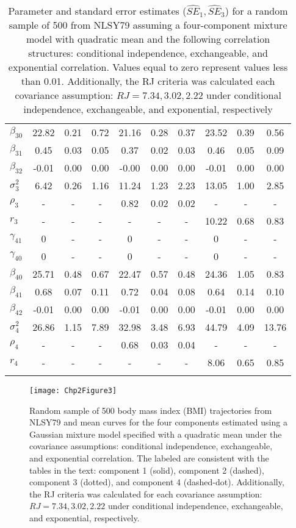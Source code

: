 \begin{table}[ht]
\begin{center}
\begin{tabular}{lccccccccc}
  $\beta_{30}$ & 22.82 & 0.21 & 0.72 & 21.16 & 0.28 & 0.37 & 23.52 & 0.39 & 0.56 \\ 
  $\beta_{31}$ & 0.45 & 0.03 & 0.05 & 0.37 & 0.02 & 0.03 & 0.46 & 0.05 & 0.09 \\ 
  $\beta_{32}$ & -0.01 & 0.00 & 0.00 & -0.00 & 0.00 & 0.00 & -0.01 & 0.00 & 0.00 \\ 
  $\sigma_3^2$ & 6.42 & 0.26 & 1.16 & 11.24 & 1.23 & 2.23 & 13.05 & 1.00 & 2.85 \\ 
  $\rho_3$ & - & - & - & 0.82 & 0.02 & 0.02 & - & - & - \\ 
  $r_3$ & - & - & - & - & - & - & 10.22 & 0.68 & 0.83 \\ 
  $\gamma_{41}$ & 0 & - & - & 0 & - & - & 0 & - & - \\ 
  $\gamma_{40}$ & 0 & - & - & 0 & - & - & 0 & - & - \\ 
  $\beta_{40}$ & 25.71 & 0.48 & 0.67 & 22.47 & 0.57 & 0.48 & 24.36 & 1.05 & 0.83 \\ 
  $\beta_{41}$ & 0.68 & 0.07 & 0.11 & 0.72 & 0.04 & 0.08 & 0.64 & 0.14 & 0.10 \\ 
  $\beta_{42}$ & -0.01 & 0.00 & 0.00 & -0.01 & 0.00 & 0.00 & -0.01 & 0.00 & 0.00 \\ 
  $\sigma_4^2$ & 26.86 & 1.15 & 7.89 & 32.98 & 3.48 & 6.93 & 44.79 & 4.09 & 13.76 \\ 
  $\rho_4$ & - & - & - & 0.68 & 0.03 & 0.04 & - & - & - \\ 
  $r_4$ & - & - & - & - & - & - & 8.06 & 0.65 & 0.85 \\ 
   \thickhline\end{tabular}
\caption{Parameter and standard error estimates ($\widehat{SE}_{1},\widehat{SE}_{3}$) for a random sample of 500 from NLSY79 assuming a four-component mixture model with quadratic mean and the following correlation structures: conditional independence, exchangeable, and exponential correlation. Values equal to zero represent values less than 0.01. Additionally, the RJ criteria was calculated each covariance assumption: $RJ=7.34, 3.02, 2.22$ under conditional independence, exchangeable, and exponential, respectively}
\label{tab:dat}
\end{center}
\end{table}

\begin{figure}
\begin{center}
\texttt{[image: Chp2Figure3]}
\end{center}
\caption{Random sample of 500 body mass index (BMI) trajectories from NLSY79 and mean curves for the four components estimated using a Gaussian mixture model specified with a quadratic mean under the covariance assumptions: conditional independence, exchangeable, and exponential correlation. The labeled are consistent with the tables in the text: component 1 (solid), component 2 (dashed), component 3 (dotted), and component 4 (dashed-dot). Additionally, the RJ criteria was calculated for each covariance assumption: $RJ =7.34,3.02,2.22$ under conditional independence, exchangeable, and exponential, respectively.}
\label{fig:2-3}
\end{figure}

